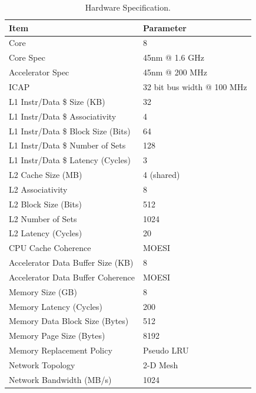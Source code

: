 \begin{table}
\scriptsize
\begin{center}
  \begin{tabular} { | l | l | }
    \hline
    \textbf{Item} & \textbf{Parameter} \\
    \hline
    \hline
	Core & 8 \\
	\hline
	Core Spec & 45nm @ 1.6 GHz \\
	\hline
	Accelerator Spec& 45nm @ 200 MHz \\
	\hline
	ICAP & 32 bit bus width @ 100 MHz \\
	\hline
	L1 Instr/Data \$ Size (KB) & 32 \\
	\hline
    L1 Instr/Data \$ Associativity & 4\\
    \hline
    L1 Instr/Data \$ Block Size (Bits) & 64\\
    \hline
    L1 Instr/Data \$ Number of Sets & 128\\
    \hline
    L1 Instr/Data \$ Latency (Cycles) & 3 \\
   	\hline
   	L2 Cache Size (MB) & 4 (shared) \\
   	\hline
    L2 Associativity & 8\\
    \hline
    L2 Block Size (Bits) & 512\\
    \hline
    L2 Number of Sets & 1024 \\
    \hline
    L2 Latency (Cycles) & 20\\
    \hline
    CPU Cache Coherence & MOESI\\
    \hline
    Accelerator Data Buffer Size (KB) & 8 \\
    \hline
    Accelerator Data Buffer Coherence & MOESI\\
    \hline
    Memory Size (GB) & 8 \\
    \hline
    Memory Latency (Cycles) & 200 \\
    \hline
    Memory Data Block Size (Bytes) & 512\\
    \hline
    Memory Page Size (Bytes) & 8192\\
    \hline
    Memory Replacement Policy & Pseudo LRU\\
    \hline
    Network Topology & 2-D Mesh\\
    \hline
    Network Bandwidth (MB/s) & 1024\\
    \hline
  \end{tabular}
\caption{Hardware Specification.}
\label{tbl_parameters}
\end{center}
\end{table}


